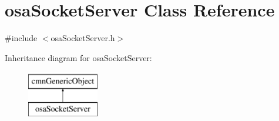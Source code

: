 \hypertarget{classosa_socket_server}{}\section{osa\+Socket\+Server Class Reference}
\label{classosa_socket_server}


{\ttfamily \#include $<$osa\+Socket\+Server.\+h$>$}

Inheritance diagram for osa\+Socket\+Server\+:\begin{figure}[H]
\begin{center}
\leavevmode
\includegraphics[height=2.000000cm]{dd/d83/classosa_socket_server}
\end{center}
\end{figure}
